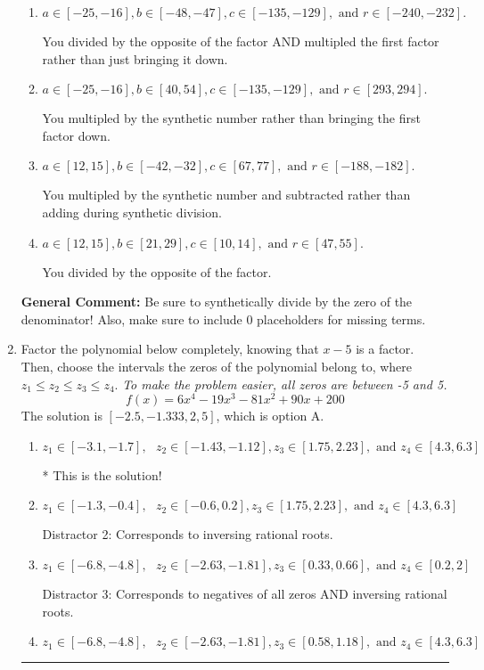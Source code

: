 \documentclass{extbook}[14pt]
\newcommand{\litem}[1]{\item #1

\rule{\textwidth}{0.4pt}}
\begin{document}
\begin{enumerate}
{\begin{enumerate}[label=\Alph*.]
* This is the solution!
\item \( a \in [-25, -16], b \in [-48, -47], c \in [-135, -129], \text{ and } r \in [-240, -232]. \)

 You divided by the opposite of the factor AND multipled the first factor rather than just bringing it down.
\item \( a \in [-25, -16], b \in [40, 54], c \in [-135, -129], \text{ and } r \in [293, 294]. \)

 You multipled by the synthetic number rather than bringing the first factor down.
\item \( a \in [12, 15], b \in [-42, -32], c \in [67, 77], \text{ and } r \in [-188, -182]. \)

 You multipled by the synthetic number and subtracted rather than adding during synthetic division.
\item \( a \in [12, 15], b \in [21, 29], c \in [10, 14], \text{ and } r \in [47, 55]. \)

 You divided by the opposite of the factor.
\end{enumerate}

\textbf{General Comment:} Be sure to synthetically divide by the zero of the denominator! Also, make sure to include 0 placeholders for missing terms.
}
\litem{
Factor the polynomial below completely, knowing that $x -5$ is a factor. Then, choose the intervals the zeros of the polynomial belong to, where $z_1 \leq z_2 \leq z_3 \leq z_4$. \textit{To make the problem easier, all zeros are between -5 and 5.}
\[ f(x) = 6x^{4} -19 x^{3} -81 x^{2} +90 x + 200 \]The solution is \( [-2.5, -1.333, 2, 5] \), which is option A.\begin{enumerate}[label=\Alph*.]
\item \( z_1 \in [-3.1, -1.7], \text{   }  z_2 \in [-1.43, -1.12], z_3 \in [1.75, 2.23], \text{   and   } z_4 \in [4.3, 6.3] \)

* This is the solution!
\item \( z_1 \in [-1.3, -0.4], \text{   }  z_2 \in [-0.6, 0.2], z_3 \in [1.75, 2.23], \text{   and   } z_4 \in [4.3, 6.3] \)

 Distractor 2: Corresponds to inversing rational roots.
\item \( z_1 \in [-6.8, -4.8], \text{   }  z_2 \in [-2.63, -1.81], z_3 \in [0.33, 0.66], \text{   and   } z_4 \in [0.2, 2] \)

 Distractor 3: Corresponds to negatives of all zeros AND inversing rational roots.
\item \( z_1 \in [-6.8, -4.8], \text{   }  z_2 \in [-2.63, -1.81], z_3 \in [0.58, 1.18], \text{   and   } z_4 \in [4.3, 6.3] \)


\end{enumerate}}
\end{enumerate}
\end{document}
